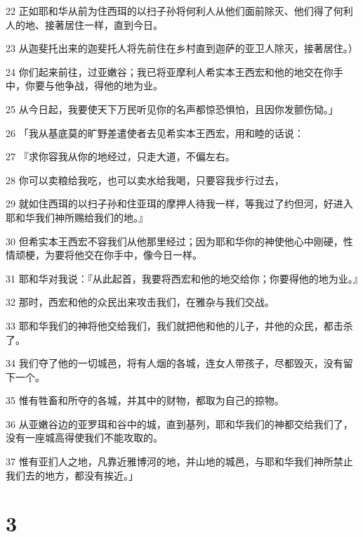 \par 22 正如耶和华从前为住西珥的以扫子孙将何利人从他们面前除灭、他们得了何利人的地、接著居住一样，直到今日。
\par 23 从迦斐托出来的迦斐托人将先前住在乡村直到迦萨的亚卫人除灭，接著居住。）
\par 24 你们起来前往，过亚嫩谷；我已将亚摩利人希实本王西宏和他的地交在你手中，你要与他争战，得他的地为业。
\par 25 从今日起，我要使天下万民听见你的名声都惊恐惧怕，且因你发颤伤恸。」
\par 26 「我从基底莫的旷野差遣使者去见希实本王西宏，用和睦的话说：
\par 27 『求你容我从你的地经过，只走大道，不偏左右。
\par 28 你可以卖粮给我吃，也可以卖水给我喝，只要容我步行过去，
\par 29 就如住西珥的以扫子孙和住亚珥的摩押人待我一样，等我过了约但河，好进入耶和华我们神所赐给我们的地。』
\par 30 但希实本王西宏不容我们从他那里经过；因为耶和华你的神使他心中刚硬，性情顽梗，为要将他交在你手中，像今日一样。
\par 31 耶和华对我说：『从此起首，我要将西宏和他的地交给你；你要得他的地为业。』
\par 32 那时，西宏和他的众民出来攻击我们，在雅杂与我们交战。
\par 33 耶和华我们的神将他交给我们，我们就把他和他的儿子，并他的众民，都击杀了。
\par 34 我们夺了他的一切城邑，将有人烟的各城，连女人带孩子，尽都毁灭，没有留下一个。
\par 35 惟有牲畜和所夺的各城，并其中的财物，都取为自己的掠物。
\par 36 从亚嫩谷边的亚罗珥和谷中的城，直到基列，耶和华我们的神都交给我们了，没有一座城高得使我们不能攻取的。
\par 37 惟有亚扪人之地，凡靠近雅博河的地，并山地的城邑，与耶和华我们神所禁止我们去的地方，都没有挨近。」

\chapter{3}

